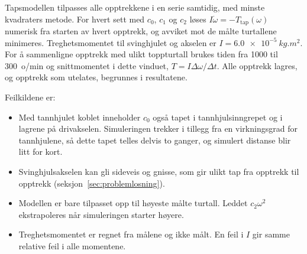 Tapsmodellen tilpasses alle opptrekkene i en serie samtidig, med minste kvadraters metode. For hvert sett med $c_0$, $c_1$ og $c_2$ løses $I \dot\omega = -T_\text{tap}(\omega)$ numerisk fra starten av hvert opptrekk, og avviket mot de målte turtallene minimeres. Treghetsmomentet til svinghjulet og akselen er $I = \SI{6,0e-5}{kg.m^2}$. For å sammenligne opptrekk med ulikt toppturtall brukes tiden fra 1000 til \SI{300}{o/min} og snittmomentet i dette vinduet, $T = I \Delta\omega / \Delta t$. Alle opptrekk lagres, og opptrekk som utelates, begrunnes i resultatene.

Feilkildene er:
\begin{itemize}
    \item Med tannhjulet koblet inneholder $c_0$ også tapet i tannhjulsinngrepet og i lagrene på drivakselen. Simuleringen trekker i tillegg fra en virkningsgrad for tannhjulene, så dette tapet telles delvis to ganger, og simulert distanse blir litt for kort.
    \item Svinghjulsakselen kan gli sideveis og gnisse, som gir ulikt tap fra opptrekk til opptrekk (seksjon~\ref{sec:problemlosning}).
    \item Modellen er bare tilpasset opp til høyeste målte turtall. Leddet $c_2 \omega^2$ ekstrapoleres når simuleringen starter høyere.
    \item Treghetsmomentet er regnet fra målene og ikke målt. En feil i $I$ gir samme relative feil i alle momentene.
\end{itemize}

